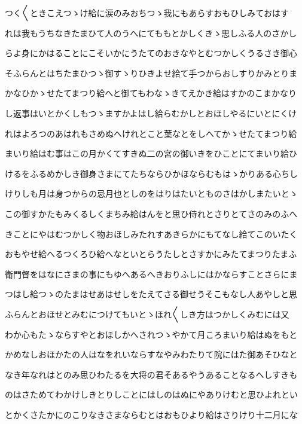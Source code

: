 \documentclass[a4paper,11pt,landscape]{ltjtarticle}
\begin{document}
つく〱ときこえつゝけ給に涙のみおちつゝ我にもあらすおもひしみておはす
\par\medskip
れは我もうちなきたまひて人のうへにてももとかしくきゝ思しふる人のさかし
\par\medskip
らよ身にかはることにこそいかにうたてのおきなやとむつかしくうるさき御心
\par\medskip
そふらんとはちたまひつゝ御すゝりひきよせ給て手つからおしすりかみとりま
\par\medskip
かなひかゝせたてまつり給へと御てもわなゝきてえかき給はすかのこまかなり
\par\medskip
し返事はいとかくしもつゝますかよはし給らむかしとおほしやるにいとにくけ
\par\medskip
れはよろつのあはれもさめぬへけれとこと葉なとをしへてかゝせたてまつり給
\par\medskip
まいり給はむ事はこの月かくてすきぬ二の宮の御いきをひことにてまいり給ひ
\par\medskip
けるをふるめかしき御身さまにてたちならひかほならむもはゝかりある心ちし
\par\medskip
けりしも月は身つからの忌月也としのをはりはたいとものさはかしまたいとゝ
\par\medskip
この御すかたもみくるしくまちみ給はんをと思ひ侍れとさりとてさのみのふへ
\par\medskip
きことにやはむつかしく物おほしみたれすあきらかにもてなし給てこのいたく
\par\medskip
おもやせ給へるつくろひ給へなといとらうたしとさすかにみたてまつりたまふ
\par\medskip
衛門督をはなにさまの事にもゆへあるへきおりふしにはかならすことさらにま
\par\medskip
つはし給つゝのたまはせあはせしをたえてさる御せうそこもなし人あやしと思
\par\medskip
ふらんとおほせとみむにつけてもいとゝほれ〱しき方はつかしくみむには又
\par\medskip
わか心もたゝならすやとおほしかへされつゝやかて月ころまいり給はぬをもと
\par\medskip
かめなしおほかたの人はなをれいならすなやみわたりて院にはた御あそひなと
\par\medskip
なき年なれはとのみ思ひわたるを大将の君そあるやうあることなるへしすきも
\par\medskip
のはさためてわかけしきとりしことにはしのはぬにやありけむと思ひよれとい
\par\medskip
とかくさたかにのこりなきさまならむとはおもひより給はさりけり十二月にな
\par\medskip
\end{document}
